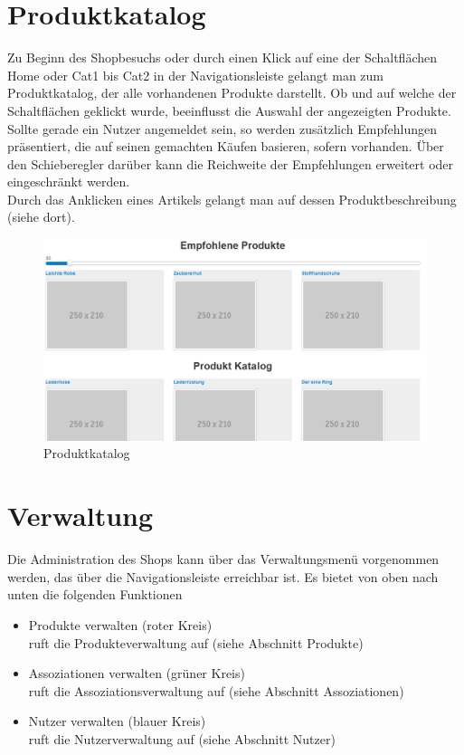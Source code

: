 \section{Produktkatalog}
Zu Beginn des Shopbesuchs oder durch einen Klick auf eine der Schaltflächen Home oder Cat1 bis Cat2 in der Navigationsleiste gelangt man zum Produktkatalog, der alle vorhandenen Produkte darstellt. Ob und auf welche der Schaltflächen geklickt wurde, beeinflusst die Auswahl der angezeigten Produkte. \\
Sollte gerade ein Nutzer angemeldet sein, so werden zusätzlich Empfehlungen prä\-sen\-tiert, die auf seinen gemachten Käufen basieren, sofern vorhanden. Über den Schieberegler darüber kann die Reichweite der Empfehlungen erweitert oder eingeschränkt werden. \\
Durch das Anklicken eines Artikels gelangt man auf dessen Produktbeschreibung (siehe dort).

\begin{figure}[h!]
  \centering
  \includegraphics[width=\textwidth]{img/Produktkatalog.png}
  \caption{Produktkatalog}
  \label{fig:Produktkatalog}
\end{figure}


\section{Verwaltung}
Die Administration des Shops kann über das Verwaltungsmenü vorgenommen werden, das über die Navigationsleiste erreichbar ist. Es bietet von oben nach unten die folgenden Funktionen
\begin{itemize}
  \item Produkte verwalten (roter Kreis) \\
        ruft die Produkteverwaltung auf (siehe Abschnitt Produkte)
  \vspace*{-0.5em}
  \item Assoziationen verwalten (grüner Kreis) \\
        ruft die Assoziationsverwaltung auf (siehe Abschnitt Assoziationen)
  \vspace*{-0.5em}
  \item Nutzer verwalten (blauer Kreis) \\
        ruft die Nutzerverwaltung auf (siehe Abschnitt Nutzer)
\end{itemize}

